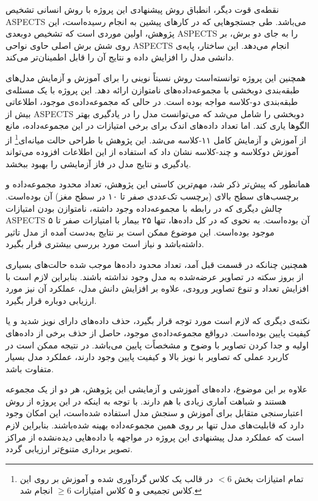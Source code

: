 نقطه‌ی قوت دیگر، انطباق روش پیشنهادی این پروژه با روش انسانی تشخیص ASPECTS می‌باشد.
طی جستجو‌هایی که در کارهای پیشین به انجام رسیده‌است،
این پژوهش، اولین موردی است که تشخیص دو‌بعدی ASPECTS را به جای دو برش، بر روی شش برش اصلی حاوی نواحی ASPECTS انجام می‌دهد.
این ساختار، پایه‌ی دانشی مدل را افزایش داده و نتایج آن را قابل اطمینان‌تر می‌کند.

همچنین این پروژه توانسته‌است روش نسبتاً نوینی را برای 
آموزش و آزمایش مدل‌های طبقه‌بندی دوبخشی با مجموعه‌داده‌‌های نامتوازن ارائه دهد.
 این پروژه با یک مسئله‌ی طبقه‌بندی دو-کلاسه مواجه بوده است.
 در حالی که مجموعه‌داده‌ی موجود، اطلاعاتی بیش از ASPECTS دوبخشی را شامل می‌شد
 که می‌توانست مدل را در یادگیری بهتر الگوها یاری کند.
 اما تعداد داده‌های اندک برای برخی امتیازات در این مجموعه‌داده، مانع از آموزش و آزمایش کامل ۱۱-کلاسه می‌شد.
 این پژوهش با 
 طراحی حالت میانه‌ای\footnote{تمام امتیازات بخش $<6$ در قالب یک کلاس گردآوری شده و آموزش بر روی این کلاس تجمیعی و ۵ کلاس امتیازات $\geq 6$ انجام شد.}
 از آموزش دو‌کلاسه و چند-کلاسه 
 نشان داد که استفاده از این اطلاعات افزوده می‌تواند 
 یادگیری و نتایج مدل در فاز آزمایشی را بهبود ببخشد.

همانطور که پیش‌تر ذکر شد، مهم‌ترین کاستی این پژوهش، تعداد محدود مجموعه‌داده و برچسب‌های سطح بالای (برچسب تک‌عددی صفر تا ۱۰ در سطح مغز) آن بوده‌است.
چالش دیگری که در رابطه با مجموعه‌داده وجود داشته، نامتوازن بودن امتیازات ASPECTS آن بوده‌است.
به نحوی که در کل داده‌ها، تنها ۲۵ بیمار با امتیازات صفر تا ۵ موجود بوده‌است.
این موضوع ممکن است بر نتایج به‌دست آمده از مدل تاثیر داشته‌باشد و نیاز است مورد بررسی بیشتری قرار بگیرد.

همچنین چنانکه در قسمت قبل آمد، تعداد محدود داده‌ها موجب شده حالت‌های بسیاری از بروز سکته در تصاویر عرضه‌شده به مدل وجود نداشته باشند.
بنابراین لازم است با افزایش تعداد و تنوع تصاویر ورودی، 
علاوه بر افزایش دانش مدل، عملکرد آن نیز مورد ارزیابی دوباره قرار بگیرد.

نکته‌ی دیگری که لازم است مورد توجه قرار بگیرد، حذف داده‌های دارای نویز شدید و یا کیفیت پایین بوده‌است.
درواقع مجموعه‌داده‌‌ی موجود، حاصل از حذف برخی از داده‌های اولیه و جدا کردن تصاویر با وضوح و مشخصاًت پایین می‌باشد.
در نتیجه ممکن است در کاربرد عملی که تصاویر با نویز بالا و کیفیت پایین وجود دارند، عملکرد مدل بسیار متفاوت باشد.

علاوه بر این موضوع، داده‌های آموزشی و آزمایشی
این پژوهش، هر دو از یک مجموعه هستند و شباهت آماری زیادی با هم دارند.
با توجه به اینکه در این پروژه از روش اعتبارسنجی متقابل برای آموزش و سنجش مدل استفاده شده‌است، این امکان وجود دارد که قابلیت‌های مدل تنها بر روی همین مجموعه‌داده بهینه شده‌باشند.
بنابراین لازم است که
عملکرد مدل پیشنهادی این پروژه در مواجهه با داده‌هایی دیده‌نشده از مراکز تصویر برداری متنوع‌تر ارزیابی گردد.

